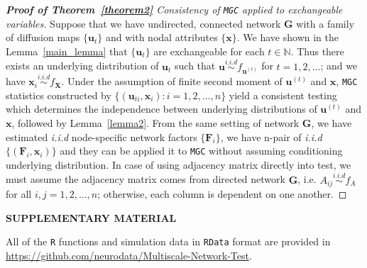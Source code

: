 \documentclass[12pt]{article}
\theoremstyle{definition}
\begin{document}
\begin{proof}[\textbf{Proof of Theorem~\ref{theorem2}} Consistency of \texttt{MGC} applied to exchangeable variables]

Suppose that we have undirected, connected network $\mathbf{G}$ with a family of diffusion maps $\{ \mathbf{u}_{t}  \}$ and with nodal attributes $\{ \mathbf{x}  \}$. We have shown in the Lemma~\ref{main_lemma} that $\{ \mathbf{u}_{t}  \}$ are exchangeable for each $t \in \mathbb{N}$. Thus there exists an underlying distribution of $\mathbf{u}_{t}$ such that $\mathbf{u} \overset{i.i.d}{\sim} f_{\mathbf{u}^{(t)}}$ for $t= 1,2,\ldots $; and we have $\mathbf{x}_{i} \overset{i.i.d}{\sim} f_{\mathbf{X}}$. Under the assumption of finite second moment of $\mathbf{u}^{(t)}$ and $\mathbf{x}$, \texttt{MGC} statistics constructed by $\{  (  \mathbf{u}_{ti}, \mathbf{x}_{i} ) : i = 1,2,\ldots, n  \}$ yield a consistent testing which determines the independence between underlying distributions of $\mathbf{u}^{(t)}$ and $\mathbf{x}$, followed by Lemma~\ref{lemma2}. 
From the same setting of network $\mathbf{G}$, we have estimated \textit{i.i.d} node-specific network factors $\{ \mathbf{F}_{i} \}$, we have n-pair of \textit{i.i.d} $\{ ( \mathbf{F}_{i}, \mathbf{x}_{i} )  \}$ and they can be applied it to \texttt{MGC} without assuming conditioning underlying distribution. In case of using adjacency matrix directly into test, we must assume the adjacency matrix comes from directed network $\mathbf{G}$, i.e. $A_{ij} \overset{i.i.d}{\sim} f_{A}$ for all $i,j=1,2,\ldots, n$; otherwise, each column is dependent on one another.  
\end{proof}




	
\newpage
\bigskip
\begin{center}
	{\large\bf SUPPLEMENTARY MATERIAL}
\end{center}
	
All of the \texttt{R} functions and simulation data in \texttt{RData} format are provided in \url{https://github.com/neurodata/Multiscale-Network-Test}.
	
	
\end{document}
